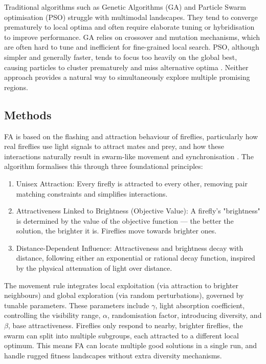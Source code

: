 \documentclass[a4paper, 12pt]{extarticle}
\begin{document}
Traditional algorithms such as Genetic Algorithms (GA) and Particle Swarm optimisation (PSO) struggle with multimodal landscapes. They tend to converge prematurely to local optima and often require elaborate tuning or hybridisation to improve performance. GA relies on crossover and mutation mechanisms, which are often hard to tune and inefficient for fine-grained local search. PSO, although simpler and generally faster, tends to focus too heavily on the global best, causing particles to cluster prematurely and miss alternative optima \cite{yang2009firefly}. Neither approach provides a natural way to simultaneously explore multiple promising regions. 

\subsection{Methods}

FA is based on the flashing and attraction behaviour of fireflies, particularly how real fireflies use light signals to attract mates and prey, and how these interactions naturally result in swarm-like movement and synchronisation \cite{yang2009firefly}. The algorithm formalises this through three foundational principles: 

\begin{enumerate}
    \item Unisex Attraction: Every firefly is attracted to every other, removing pair matching constraints and simplifies interactions. 
    \item Attractiveness Linked to Brightness (Objective Value): A firefly’s "brightness" is determined by the value of the objective function — the better the solution, the brighter it is. Fireflies move towards brighter ones.
    \item Distance-Dependent Influence: Attractiveness and brightness decay with distance, following either an exponential or rational decay function, inspired by the physical attenuation of light over distance. 
\end{enumerate}

The movement rule integrates local exploitation (via attraction to brighter neighbours) and global exploration (via random perturbations), governed by tunable parameters. These parameters include $\gamma$, light absorption coefficient, controlling the visibility range, $\alpha$, randomisation factor, introducing diversity, and $\beta$, base attractiveness. Fireflies only respond to nearby, brighter fireflies, the swarm can split into multiple subgroups, each attracted to a different local optimum. This means FA can locate multiple good solutions in a single run,  and handle rugged fitness landscapes without extra diversity mechanisms. 
\end{document}
